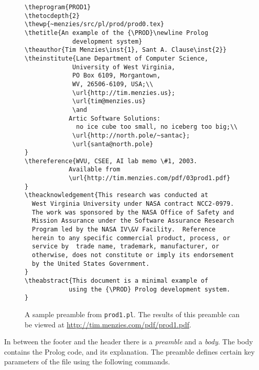 \begin{figure}
{\scriptsize \begin{verbatim}
\theprogram{PROD1}
\thetocdepth{2}
\thewp{~menzies/src/pl/prod/prod0.tex}
\thetitle{An example of the {\PROD}\newline Prolog
             development system}
\theauthor{Tim Menzies\inst{1}, Sant A. Clause\inst{2}}
\theinstitute{Lane Department of Computer Science,
             University of West Virginia,
             PO Box 6109, Morgantown,
             WV, 26506-6109, USA;\\
             \url{http://tim.menzies.us};
             \url{tim@menzies.us}
             \and
            Artic Software Solutions:
              no ice cube too small, no iceberg too big;\\
             \url{http://north.pole/~santac};
             \url{santa@north.pole}
}
\thereference{WVU, CSEE, AI lab memo \#1, 2003.
            Available from
            \url{http://tim.menzies.com/pdf/03prod1.pdf}
}
\theacknowledgement{This research was conducted at
  West Virginia University under NASA contract NCC2-0979.
  The work was sponsored by the NASA Office of Safety and
  Mission Assurance under the Software Assurance Research
  Program led by the NASA IV\&V Facility.  Reference
  herein to any specific commercial product, process, or
  service by  trade name, trademark, manufacturer, or
  otherwise, does not constitute or imply its endorsement
  by the United States Government.
}
\theabstract{This document is a minimal example of
            using the {\PROD} Prolog development system.
}
\end{verbatim}}
\caption[A sample {\PROD} preamble.]{A sample {\PROD} preamble from {\tt prod1.pl}. The results
of this preamble can be viewed at
\protect\url{http://tim.menzies.com/pdf/prod1.pdf}.}\label{fig:samplepreamble}
\end{figure}

In between the footer and the header there is a {\em preamble} and a {\em body}.
The body contains the Prolog code, and its explanation. The preamble defines
certain key parameters of the file using the following commands.

